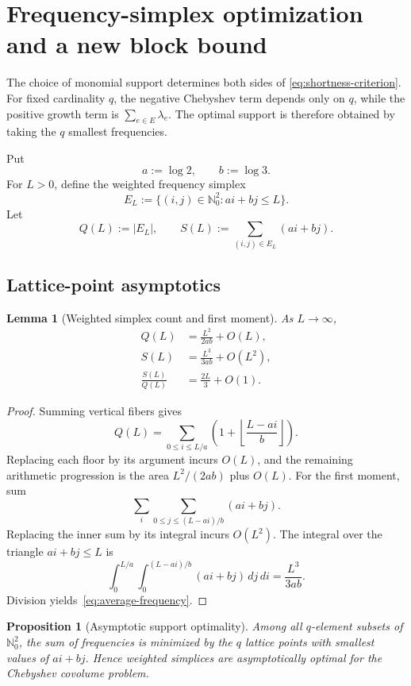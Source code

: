\documentclass[11pt,oneside]{article}
\newtheorem{proposition}[theorem]{Proposition}
\newtheorem{lemma}[theorem]{Lemma}
\theoremstyle{definition}
\theoremstyle{remark}
\newcommand{\Nzero}{\mathbb N_0}
\begin{document}
\section{Frequency-simplex optimization and a new block bound}
\label{sec:block-bound}

The choice of monomial support determines both sides of
\eqref{eq:shortness-criterion}.  For fixed cardinality $q$, the negative Chebyshev term depends
only on $q$, while the positive growth term is
$\sum_{e\in E}\lambda_e$.  The optimal support is therefore obtained by taking the $q$
smallest frequencies.

Put
\[
 a:=\log2,
 \qquad b:=\log3.
\]
For $L>0$, define the weighted frequency simplex
\begin{equation}
 E_L:=\{(i,j)\in\Nzero^2:ai+bj\le L\}.
 \label{eq:weighted-simplex}
\end{equation}
Let
\[
 Q(L):=|E_L|,
 \qquad
 S(L):=\sum_{(i,j)\in E_L}(ai+bj).
\]

\subsection{Lattice-point asymptotics}

\begin{lemma}[Weighted simplex count and first moment]
\label{lem:simplex-asymptotics}
As $L\to\infty$,
\begin{align}
 Q(L)&=\frac{L^2}{2ab}+O(L),\label{eq:QL}\\
 S(L)&=\frac{L^3}{3ab}+O(L^2),\label{eq:SL}\\
 \frac{S(L)}{Q(L)}&=\frac{2L}{3}+O(1).\label{eq:average-frequency}
\end{align}
\end{lemma}

\begin{proof}
Summing vertical fibers gives
\[
 Q(L)=\sum_{0\le i\le L/a}
 \left(1+\left\lfloor\frac{L-ai}{b}\right\rfloor\right).
\]
Replacing each floor by its argument incurs $O(L)$, and the remaining arithmetic progression
is the area $L^2/(2ab)$ plus $O(L)$.  For the first moment, sum
\[
 \sum_i\sum_{0\le j\le(L-ai)/b}(ai+bj).
\]
Replacing the inner sum by its integral incurs $O(L^2)$.  The integral over the triangle
$ai+bj\le L$ is
\[
 \int_0^{L/a}\int_0^{(L-ai)/b}(ai+bj)\,dj\,di=\frac{L^3}{3ab}.
\]
Division yields~\eqref{eq:average-frequency}.
\end{proof}

\begin{proposition}[Asymptotic support optimality]
\label{prop:support-optimality}
Among all $q$-element subsets of $\Nzero^2$, the sum of frequencies is minimized by the
$q$ lattice points with smallest values of $ai+bj$.  Hence weighted simplices are
asymptotically optimal for the Chebyshev covolume problem.
\end{proposition}
\end{document}
